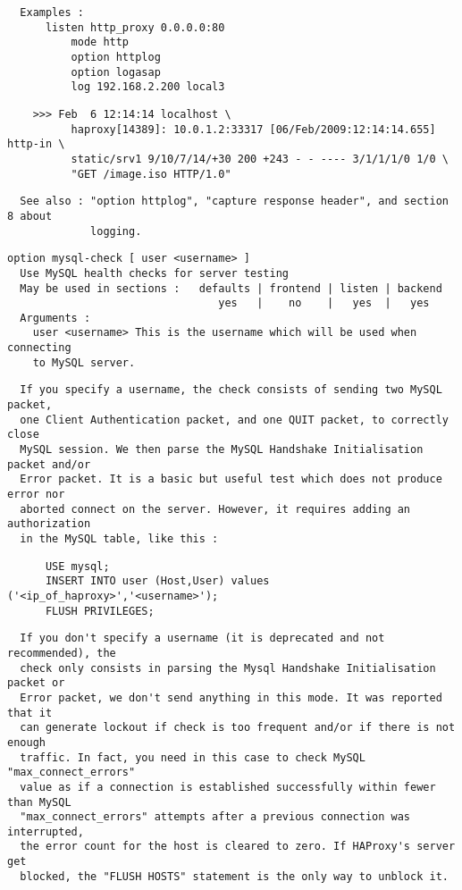 \begin{verbatim}
  Examples :
      listen http_proxy 0.0.0.0:80
          mode http
          option httplog
          option logasap
          log 192.168.2.200 local3
\end{verbatim}

\begin{verbatim}
    >>> Feb  6 12:14:14 localhost \
          haproxy[14389]: 10.0.1.2:33317 [06/Feb/2009:12:14:14.655] http-in \
          static/srv1 9/10/7/14/+30 200 +243 - - ---- 3/1/1/1/0 1/0 \
          "GET /image.iso HTTP/1.0"
\end{verbatim}

\begin{verbatim}
  See also : "option httplog", "capture response header", and section 8 about
             logging.
\end{verbatim}

\begin{verbatim}
option mysql-check [ user <username> ]
  Use MySQL health checks for server testing
  May be used in sections :   defaults | frontend | listen | backend
                                 yes   |    no    |   yes  |   yes
  Arguments :
    user <username> This is the username which will be used when connecting
    to MySQL server.
\end{verbatim}

\begin{verbatim}
  If you specify a username, the check consists of sending two MySQL packet,
  one Client Authentication packet, and one QUIT packet, to correctly close
  MySQL session. We then parse the MySQL Handshake Initialisation packet and/or
  Error packet. It is a basic but useful test which does not produce error nor
  aborted connect on the server. However, it requires adding an authorization
  in the MySQL table, like this :
\end{verbatim}

\begin{verbatim}
      USE mysql;
      INSERT INTO user (Host,User) values ('<ip_of_haproxy>','<username>');
      FLUSH PRIVILEGES;
\end{verbatim}

\begin{verbatim}
  If you don't specify a username (it is deprecated and not recommended), the
  check only consists in parsing the Mysql Handshake Initialisation packet or
  Error packet, we don't send anything in this mode. It was reported that it
  can generate lockout if check is too frequent and/or if there is not enough
  traffic. In fact, you need in this case to check MySQL "max_connect_errors"
  value as if a connection is established successfully within fewer than MySQL
  "max_connect_errors" attempts after a previous connection was interrupted,
  the error count for the host is cleared to zero. If HAProxy's server get
  blocked, the "FLUSH HOSTS" statement is the only way to unblock it.
\end{verbatim}

